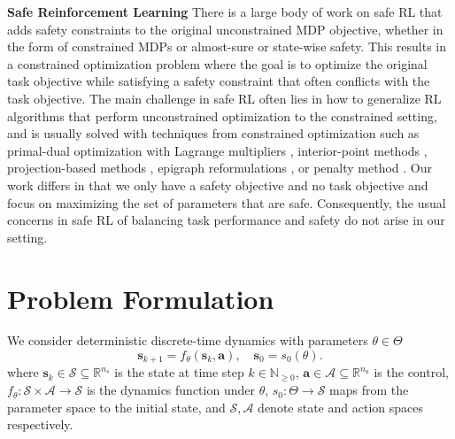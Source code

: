 \documentclass{article} %
\def\vb{{\bm{b}}}
\def\vu{{\bm{u}}}
\def\vx{{\bm{x}}}
\newcommand*{\XSet}{\mathcal{X}}
\newcommand*{\USet}{\mathcal{U}}
\def\vu{{\vb{u}}}
\def\vx{{\vb{x}}}
\def\vx{{\bm{s}}}
\def\vu{{\bm{a}}}
\def\XSet{{\mathcal{S}}}
\def\USet{{\mathcal{A}}}
\begin{document}
\textbf{Safe Reinforcement Learning } 
There is a large body of work on safe RL that adds safety constraints to the original unconstrained MDP objective, whether in the form of constrained MDPs \citep{altman1999constrained} or almost-sure \citep{sootla2022saute} or state-wise \citep{wachi2018safe} safety.
This results in a constrained optimization problem where the goal is to optimize the original task objective while satisfying a safety constraint that often conflicts with the task objective.
The main challenge in safe RL often lies in how to generalize RL algorithms that perform unconstrained optimization to the constrained setting, and is usually solved with techniques from constrained optimization such as primal-dual optimization with Lagrange multipliers \citep{ray2019benchmarking,stooke2020responsive,li2021augmented}, interior-point methods \citep{liu2020ipo}, projection-based methods \citep{yang2020projection,xu2021crpo}, epigraph reformulations \citep{so2023solving,zhang2025solving}, or penalty method \citep{sootla2022saute,tasse2023rosarl}.
Our work differs in that we only have a safety objective and no task objective and focus on maximizing the set of parameters that are safe.
Consequently, the usual concerns in safe RL of balancing task performance and safety do not arise in our setting.

\section{Problem Formulation}
We consider deterministic discrete-time dynamics with parameters $\theta \in \Theta$
\begin{equation} \label{eq:dynamics}
    \vx_{k+1} = f_\theta(\vx_k, \vu), \quad \vx_0 = s_0(\theta).
\end{equation}
where
$\vx_k \in \XSet \subseteq \mathbb{R}^{n_s}$ is the state at time step $k \in \mathbb{N}_{\geq0}$, $\vu \in \USet \subseteq \mathbb{R}^{n_a}$ is the control,
$f_\theta : \XSet \times \USet \to \XSet$ is the dynamics function under $\theta$, $s_0 : \Theta \to \XSet$ maps from the parameter space to the initial state,
and $\XSet, \USet$ denote state and action spaces respectively.
\end{document}
